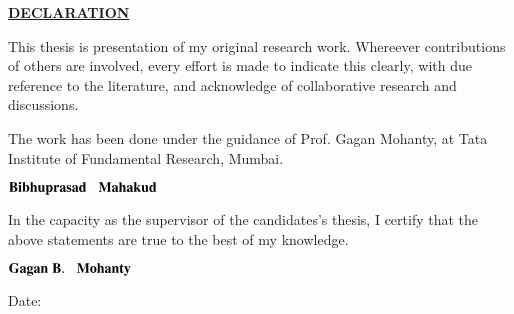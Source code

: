 \begin{center}
{\Large\underline {\bf DECLARATION}}
\end{center}


\vspace{0.3cm} This thesis is presentation of my original research work. Whereever contributions of others are involved, every effort is made to indicate this clearly, with due reference to the literature, and acknowledge of collaborative research and discussions.

The work has been done under the guidance of Prof. Gagan Mohanty, at Tata Institute of Fundamental Research, Mumbai.

\vspace{3.5cm}
\noindent
\hspace{8.5cm}${\rm \bf  Bibhuprasad \hspace{0.3cm} Mahakud}$

\vspace{3.5cm}

In the capacity as the supervisor of the candidates's thesis, I certify that the above statements are true to the best of my knowledge.


\vspace{2.5cm}
${\rm \bf Gagan \hspace{0.1cm}B. \hspace{0.3cm} Mohanty}$
\vspace{0.5cm}


Date:


